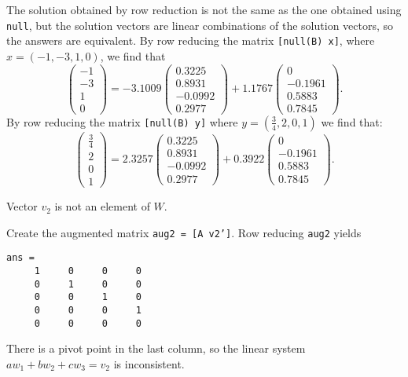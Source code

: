 \documentclass{ximera}
\begin{document}
The solution obtained by row reduction is not the same as the one
obtained using {\tt null}, but the solution vectors are linear
combinations of the \Matlab solution vectors, so the answers are
equivalent.  By row reducing the matrix {\tt [null(B) x]}, where
$x = (-1,-3,1,0)$, we find that
\[
\left(\begin{array}{r} -1 \\ -3 \\ 1 \\ 0 \end{array}\right) =
-3.1009\left(\begin{array}{r} 0.3225 \\ 0.8931 \\ -0.0992 \\ 0.2977
\end{array}\right) + 1.1767\left(\begin{array}{r} 0 \\ -0.1961 \\
0.5883 \\ 0.7845 \end{array}\right).
\]
By row reducing the matrix {\tt [null(B) y]} where $y = (\frac{3}{4},
2,0,1)$ we find that:
\[
\left(\begin{array}{r} \frac{3}{4} \\ 2 \\ 0 \\ 1 \end{array}\right) =
2.3257\left(\begin{array}{r} 0.3225 \\ 0.8931 \\ -0.0992 \\ 0.2977
\end{array}\right) + 0.3922\left(\begin{array}{r} 0 \\ -0.1961 \\
0.5883 \\ 0.7845 \end{array}\right).
\]

 \ans Vector $v_2$ is not an element of $W$.

\soln Create the augmented matrix {\tt aug2 = [A v2']}.  Row reducing
{\tt aug2} yields
\begin{verbatim}
ans =
     1     0     0     0
     0     1     0     0
     0     0     1     0
     0     0     0     1
     0     0     0     0
\end{verbatim}
There is a pivot point in the last column, so the linear system
$aw_1 + bw_2 + cw_3 = v_2$ is inconsistent.
\end{document}
